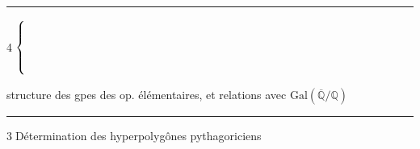 \noindent\rule{.30\linewidth}{.4pt}

\noindent\textcircled{4}\(\left\{\vphantom{\rule{0pt}{10mm}}\right.\)\begin{minipage}{.87\linewidth}
structure des gpes des op. élémentaires,
et relations avec $\mathrm{Gal}(\overline{\mathbb Q}/\mathbb Q)$
\end{minipage}

\noindent\rule{.41\linewidth}{.4pt}

\textcircled{3}\quad Détermination des hyperpolygônes pythagoriciens   \unsure{$\{\ldots\}$)}
